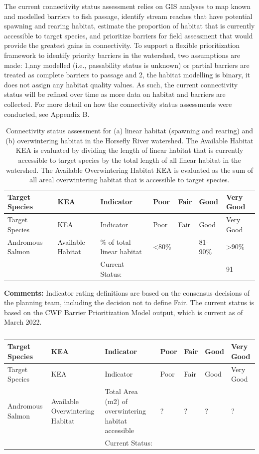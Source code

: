 \documentclass[
  letterpaper,
  DIV=11,
  numbers=noendperiod]{scrreprt}
\begin{document}
The current connectivity status assessment relies on GIS analyses to map
known and modelled barriers to fish passage, identify stream reaches
that have potential spawning and rearing habitat, estimate the
proportion of habitat that is currently accessible to target species,
and prioritize barriers for field assessment that would provide the
greatest gains in connectivity. To support a flexible prioritization
framework to identify priority barriers in the watershed, two
assumptions are made: 1,any modelled (i.e., passability status is
unknown) or partial barriers are treated as complete barriers to passage
and 2, the habitat modelling is binary, it does not assign any habitat
quality values. As such, the current connectivity status will be refined
over time as more data on habitat and barriers are collected. For more
detail on how the connectivity status assessments were conducted, see
Appendix B.

\hypertarget{tbl-connectivity}{}
\begin{longtable}[]{@{}lllllll@{}}
\caption{\label{tbl-connectivity}Connectivity status assessment for (a)
linear habitat (spawning and rearing) and (b) overwintering habitat in
the Horsefly River watershed. The Available Habitat KEA is evaluated by
dividing the length of linear habitat that is currently accessible to
target species by the total length of all linear habitat in the
watershed. The Available Overwintering Habitat KEA is evaluated as the
sum of all areal overwintering habitat that is accessible to target
species.}\label{T_2ba00_}\tabularnewline
\toprule\noalign{}
Target Species & KEA & Indicator & Poor & Fair & Good & Very Good \\
\midrule\noalign{}
\endfirsthead
\toprule\noalign{}
Target Species & KEA & Indicator & Poor & Fair & Good & Very Good \\
\midrule\noalign{}
\endhead
\bottomrule\noalign{}
\endlastfoot
Andromous Salmon & Available Habitat & \% of total linear habitat &
\textless80\% & & 81-90\% & \textgreater90\% \\
& & Current Status: & & & & 91 \\
\end{longtable}

\textbf{Comments:} Indicator rating definitions are based on the
consensus decisions of the planning team, including the decision not to
define Fair. The current status is based on the CWF Barrier
Prioritization Model output, which is current as of March 2022.

\begin{longtable}[]{@{}lllllll@{}}
\caption{}\label{T_00546_}\tabularnewline
\toprule\noalign{}
Target Species & KEA & Indicator & Poor & Fair & Good & Very Good \\
\midrule\noalign{}
\endfirsthead
\toprule\noalign{}
Target Species & KEA & Indicator & Poor & Fair & Good & Very Good \\
\midrule\noalign{}
\endhead
\bottomrule\noalign{}
\endlastfoot
Andromous Salmon & Available Overwintering Habitat & Total Area (m2) of
overwintering habitat accessible & ? & ? & ? & ? \\
& & Current Status: & & & & \\
\end{longtable}
\end{document}
